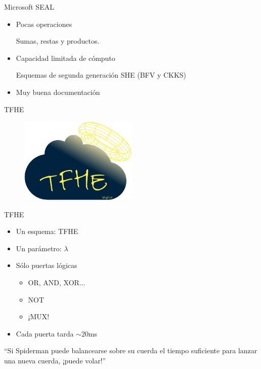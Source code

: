 \documentclass{beamer}
\begin{document}
\begin{frame}{Microsoft SEAL}

    \begin{itemize}
        \item Pocas operaciones
        
        Sumas, restas y productos.
        
        \item Capacidad limitada de cómputo
        
        Esquemas de segunda generación SHE (BFV y CKKS)

        \item Muy buena documentación

    \end{itemize}{}
    
\end{frame}

\begin{frame}{TFHE}

    \begin{figure}[H]
        \centering\includegraphics[width=0.5\textwidth]{logo_tfhe}
    \end{figure}

\end{frame}

\begin{frame}{TFHE}

    \begin{itemize}
        \item Un esquema: TFHE
        \item Un parámetro: $\lambda$
        \item Sólo puertas lógicas
        \begin{itemize}
            \item OR, AND, XOR...
            \item NOT
            \item ¡MUX!
        \end{itemize}
        \item Cada puerta tarda $\sim20$ms
    \end{itemize}{}
    
    \begin{exampleblock}{}
      {\large ``Si Spiderman puede balancearse sobre su cuerda el tiempo suficiente para lanzar una nueva cuerda, ¡puede volar!''}
      \vskip5mm
      \hspace*{}
    \end{exampleblock}
\end{frame}
\end{document}
